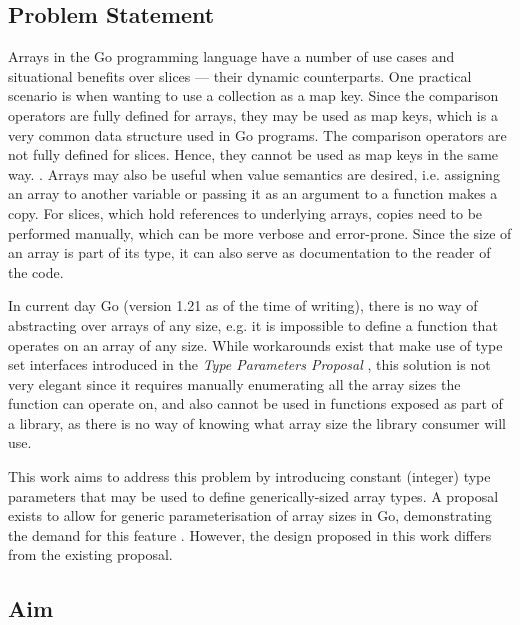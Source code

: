 

\subsection{Problem Statement}

Arrays in the Go programming language have a number of use cases and situational
benefits over slices --- their dynamic counterparts. One practical scenario is
when wanting to use a collection as a map key. Since the comparison operators
are fully defined for arrays, they may be used as map keys, which is a very
common data structure used in Go programs. The comparison operators are not
fully defined for slices. Hence, they cannot be used as map keys in the same way.
\autocite{spec}. Arrays may also be useful when value semantics are desired,
i.e. assigning an array to another variable or passing it as an argument to a
function makes a copy. For slices, which hold references to underlying arrays,
copies need to be performed manually, which can be more verbose and error-prone.
Since the size of an array is part of its type, it can also serve as
documentation to the reader of the code.

In current day Go (version 1.21 as of the time of writing), there is no way of
abstracting over arrays of any size, e.g. it is impossible to define a function
that operates on an array of any size. While workarounds exist that make use of
type set interfaces introduced in the \emph{Type Parameters Proposal}
\autocite{genericsProposal}, this solution is not very elegant since it requires
manually enumerating all the array sizes the function can operate on, and also
cannot be used in functions exposed as part of a library, as there is no way of
knowing what array size the library consumer will use.

This work aims to address this problem by introducing constant (integer) type
parameters that may be used to define generically-sized array types. A proposal
exists to allow for generic parameterisation of array sizes in Go, demonstrating
the demand for this feature \autocite{goArrayProposal}. However, the design
proposed in this work differs from the existing proposal.

\subsection{Aim}

